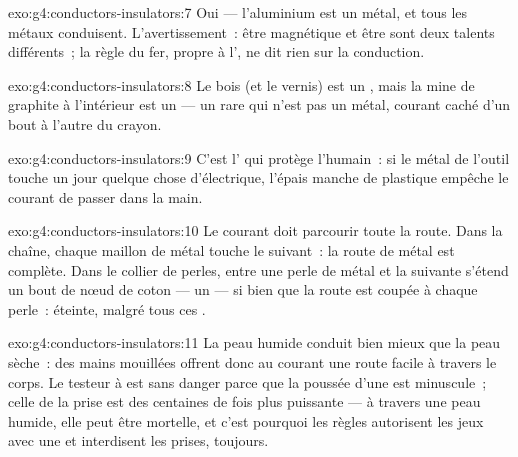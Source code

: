 \begin{solution}{exo:g4:conductors-insulators:7}
Oui --- l'aluminium est un métal, et tous les métaux conduisent.
L'avertissement~: être magnétique et être  sont deux
talents différents~; la règle du fer, propre à l', ne dit rien
sur la conduction.
\end{solution}

\begin{solution}{exo:g4:conductors-insulators:8}
Le bois (et le vernis) est un , mais la mine de graphite à
l'intérieur est un  --- un rare  qui n'est pas un
métal, courant caché d'un bout à l'autre du crayon.
\end{solution}

\begin{solution}{exo:g4:conductors-insulators:9}
C'est l' qui protège l'humain~: si le métal de l'outil touche
un jour quelque chose d'électrique, l'épais manche de plastique
empêche le courant de passer dans la main.
\end{solution}

\begin{solution}{exo:g4:conductors-insulators:10}
Le courant doit parcourir toute la route. Dans la chaîne, chaque
maillon de métal touche le suivant~: la route de métal est complète.
Dans le collier de perles, entre une perle de métal et la suivante
s'étend un bout de nœud de coton --- un  --- si bien que la
route est coupée à chaque perle~: éteinte, malgré tous ces
.
\end{solution}

\begin{solution}{exo:g4:conductors-insulators:11}
La peau humide conduit bien mieux que la peau sèche~: des mains
mouillées offrent donc au courant une route facile à travers le
corps. Le testeur à  est sans danger parce que la poussée d'une
 est minuscule~; celle de la prise est des centaines de fois plus
puissante --- à travers une peau humide, elle peut être mortelle,
et c'est pourquoi les règles autorisent les jeux avec une  et
interdisent les prises, toujours.
\end{solution}
